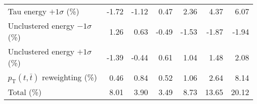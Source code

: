 \begin{table}[htbp]
{\begin{tabular}{lrrrrrr}
Tau energy $+1\sigma$ (\%) & -1.72 & -1.12 & 0.47 & 2.36 & 4.37 & 6.07 \\ 
Unclustered energy $-1\sigma$ (\%) & 1.26 & 0.63 & -0.49 & -1.53 & -1.87 & -1.94 \\ 
Unclustered energy $+1\sigma$ (\%) & -1.39 & -0.44 & 0.61 & 1.04 & 1.48 & 2.08 \\ 
$p_\mathrm{T}(t,\bar{t})$ reweighting (\%) & 0.46 & 0.84 & 0.52 & 1.06 & 2.64 & 8.14 \\ 
\hline 
Total (\%) & 8.01  & 3.90  & 3.49  & 8.73  & 13.65  & 20.12 \\ 
\hline 
\end{tabular}
}
\end{table}
